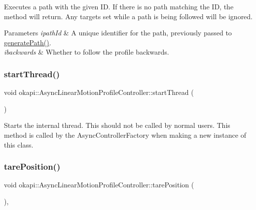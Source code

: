 Executes a path with the given ID. If there is no path matching the ID, the method will return. Any targets set while a path is being followed will be ignored.


\begin{DoxyParams}{Parameters}
{\em ipath\+Id} & A unique identifier for the path, previously passed to {\ttfamily \mbox{\hyperlink{classokapi_1_1AsyncLinearMotionProfileController_aef2acba51417d929695ca38e309b0f6c}{generate\+Path()}}}. \\
\hline
{\em ibackwards} & Whether to follow the profile backwards. \\
\hline
\end{DoxyParams}
\mbox{\label{classokapi_1_1AsyncLinearMotionProfileController_a6b9c0bc4fc13623225f0c02b992b3ed6}} 
\subsubsection{\texorpdfstring{startThread()}{startThread()}}
{\footnotesize\ttfamily void okapi\+::\+Async\+Linear\+Motion\+Profile\+Controller\+::start\+Thread (\begin{DoxyParamCaption}{ }\end{DoxyParamCaption})}

Starts the internal thread. This should not be called by normal users. This method is called by the Async\+Controller\+Factory when making a new instance of this class. \mbox{\label{classokapi_1_1AsyncLinearMotionProfileController_a6cfe67f9e4db556fbed1f2c4c4252b0a}} 
\subsubsection{\texorpdfstring{tarePosition()}{tarePosition()}}
{\footnotesize\ttfamily void okapi\+::\+Async\+Linear\+Motion\+Profile\+Controller\+::tare\+Position (\begin{DoxyParamCaption}{ }\end{DoxyParamCaption})\hspace{0.3cm}{\ttfamily [override]}, {\ttfamily [virtual]}}


